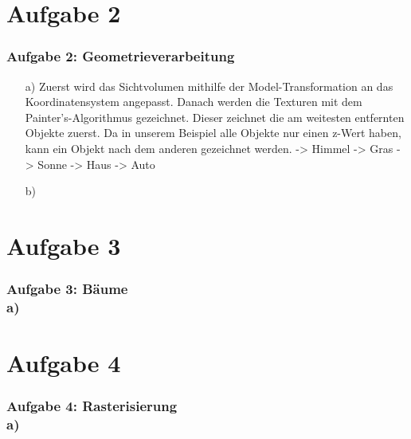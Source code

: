 \documentclass[accentcolor=tud9c,colorbacktitle,inverttitle,landscape,german,presentation,t]{tudbeamer}
\begin{document}
\section{Aufgabe 2}
	\begin{frame}
		\frametitle{Aufgabe 2: Geometrieverarbeitung} %
		\begin{itemize}
		\item[a)] Zuerst wird das Sichtvolumen mithilfe der Model-Transformation an das Koordinatensystem angepasst. Danach werden die Texturen mit dem Painter's-Algorithmus gezeichnet. Dieser zeichnet die am weitesten entfernten Objekte zuerst. Da in unserem Beispiel alle Objekte nur einen z-Wert haben, kann ein Objekt nach dem anderen gezeichnet werden. -> Himmel -> Gras -> Sonne -> Haus -> Auto
		\item[b)]
		\end{itemize}
	\end{frame}
	
\section{Aufgabe 3}
	\begin{frame}
		\frametitle{Aufgabe 3: B\"aume \\ a)} %
	\end{frame}
	
\section{Aufgabe 4}
	\begin{frame}
		\frametitle{Aufgabe 4: Rasterisierung \\ a)} %
	\end{frame}
\end{document}
